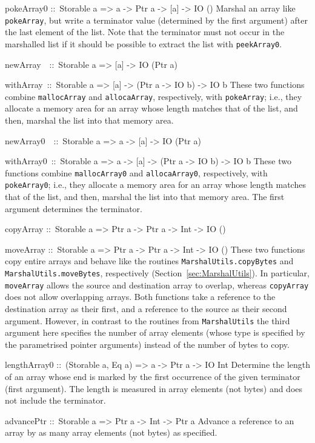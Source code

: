 \documentclass[a4paper,twosides]{article}
\makeatletter
\newcommand{\code}[1]{\texttt{#1}}      %
\newenvironment{codedesc}{%
  \list{}{\labelwidth\z@
    \let\makelabel\codedesclabel}
  }{%
  \endlist
  }
\newcommand*{\codedesclabel}[1]{%
  \hspace{-\leftmargin}
  \parbox[b]{\labelwidth}{\makebox[0pt][l]{\code{#1}}\\}\hfil\relax
  }
\newcommand{\combineitems}{\vspace*{-\itemsep}\vspace*{-\parsep}\vspace*{-1em}}
\makeatother
\begin{document}
\begin{codedesc}
\item[pokeArray0 ::\ Storable a => a -> Ptr a -> {[a]} -> IO ()]
  Marshal an array like \code{pokeArray}, but write a terminator value
  (determined by the first argument) after the last element of the list.  Note
  that the terminator must not occur in the marshalled list if it should be
  possible to extract the list with \code{peekArray0}.

\item[newArray~~::\ Storable a => {[a]} -> IO (Ptr a)]
\item[withArray~::\ Storable a => {[a]} -> (Ptr a -> IO b) -> IO b]\combineitems
  These two functions combine \code{mallocArray} and \code{allocaArray},
  respectively, with \code{pokeArray}; i.e., they allocate a memory area for
  an array whose length matches that of the list, and then, marshal the list
  into that memory area.

\item[newArray0~~::\ Storable a => a -> {[a]} -> IO (Ptr a)]
\item[withArray0~::\ Storable a => a -> {[a]} -> (Ptr a -> IO b) -> IO b]\combineitems
  These two functions combine \code{mallocArray0} and \code{allocaArray0},
  respectively, with \code{pokeArray0}; i.e., they allocate a memory area for
  an array whose length matches that of the list, and then, marshal the list
  into that memory area.  The first argument determines the terminator.

\item[copyArray ::\ Storable a => Ptr a -> Ptr a -> Int -> IO ()]
\item[moveArray ::\ Storable a => Ptr a -> Ptr a -> Int -> IO ()]\combineitems
  These two functions copy entire arrays and behave like the routines
  \code{MarshalUtils.copyBytes} and \code{MarshalUtils.moveBytes},
  respectively (Section~\ref{sec:MarshalUtils}).  In particular,
  \code{moveArray} allows the source and destination array to overlap, whereas
  \code{copyArray} does not allow overlapping arrays.  Both functions take a
  reference to the destination array as their first, and a reference to the
  source as their second argument.  However, in contrast to the routines from
  \code{MarshalUtils} the third argument here specifies the number of array
  elements (whose type is specified by the parametrised pointer arguments)
  instead of the number of bytes to copy.
  
\item[lengthArray0 ::\ (Storable a, Eq a) => a -> Ptr a -> IO Int] Determine
  the length of an array whose end is marked by the first occurrence of the
  given terminator (first argument). The length is measured in array elements
  (not bytes) and does not include the terminator.
  
\item[advancePtr ::\ Storable a => Ptr a -> Int -> Ptr a] Advance a reference
  to an array by as many array elements (not bytes) as specified.
\end{codedesc}
\end{document}
